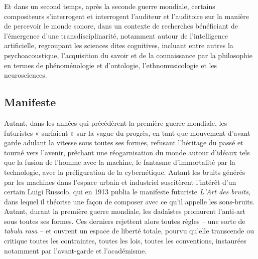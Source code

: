 \documentclass{article}
\begin{document}
Et dans un second temps, après la seconde guerre mondiale, certains compositeurs s'interrogent et interrogent l'auditeur et l'auditoire sur la manière de percevoir le monde sonore, dans un contexte de recherches bénéficiant de l'émergence d'une transdisciplinarité, notamment autour de l'intelligence artificielle, regroupant les sciences dites cognitives, incluant entre autres la psychoacoustique, l'acquisition du savoir et de la connaissance par la philosophie en termes de phénoménologie et d'ontologie, l'ethnomusicologie et les neurosciences.

\subsection*{Manifeste}
\label{manifeste}

Autant, dans les années qui précédèrent la première guerre mondiale, les futuristes « surfaient » sur la vague du progrès, en tant que mouvement d'avant-garde adulant la vitesse sous toutes ses formes, refusant l'héritage du passé et tourné vers l'avenir, prêchant une réogarnisation du monde autour d'idéaux tels que la fusion de l’homme avec la machine, le fantasme d'immortalité par la technologie, avec la préfiguration de la cybernétique. Autant les bruits générés par les machines dans l'espace urbain et industriel suscitèrent l'intérêt d'un certain Luigi Russolo, qui en 1913 publia le manifeste futuriste \textit{L'Art des bruits}, %
dans lequel il théorise une façon de composer avec ce qu'il appelle les sons-bruits. 
Autant, durant la première guerre mondiale, les dadaïstes promurent l'anti-art sous toutes ses formes. Ces derniers rejettent alors toutes règles -- une sorte de \textit{tabula rasa} -- et ouvrent un espace de liberté totale, pourvu qu'elle transcende ou critique toutes les contraintes, toutes les lois, toutes les conventions, instaurées notamment par l'avant-garde et l'académisme. 
\end{document}
